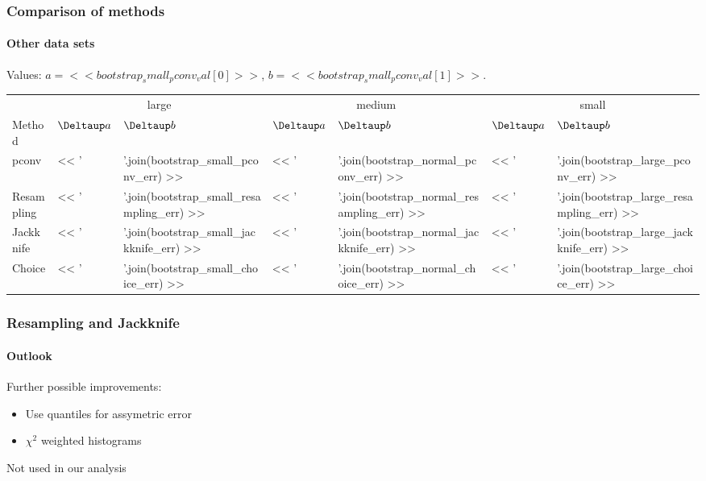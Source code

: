 \documentclass[english, fleqn]{beamer}
\begin{document}
\begin{frame}
    \frametitle{Comparison of methods}
    \framesubtitle{Other data sets}

    Values: $a = << bootstrap_small_pconv_val[0] >>$, $b = <<
    bootstrap_small_pconv_val[1] >>$.

    \begin{tabular}{l*6l}
        \toprule
        & \multicolumn{2}{c}{large}
        & \multicolumn{2}{c}{medium}
        & \multicolumn{2}{c}{small}
        \\
        \cmidrule(rl){2-3}
        \cmidrule(rl){4-5}
        \cmidrule(l){6-7}
        Method
        & $\Deltaup a$
        & $\Deltaup b$
        & $\Deltaup a$
        & $\Deltaup b$
        & $\Deltaup a$
        & $\Deltaup b$ \\
        \midrule
        pconv
        & << ' & '.join(bootstrap_small_pconv_err) >>
        & << ' & '.join(bootstrap_normal_pconv_err) >>
        & << ' & '.join(bootstrap_large_pconv_err) >> \\
        Resampling
        & << ' & '.join(bootstrap_small_resampling_err) >>
        & << ' & '.join(bootstrap_normal_resampling_err) >>
        & << ' & '.join(bootstrap_large_resampling_err) >> \\
        Jackknife
        & << ' & '.join(bootstrap_small_jackknife_err) >>
        & << ' & '.join(bootstrap_normal_jackknife_err) >>
        & << ' & '.join(bootstrap_large_jackknife_err) >> \\
        Choice
        & << ' & '.join(bootstrap_small_choice_err) >>
        & << ' & '.join(bootstrap_normal_choice_err) >>
        & << ' & '.join(bootstrap_large_choice_err) >> \\
        \bottomrule
    \end{tabular}
\end{frame}

\begin{frame}
    \frametitle{Resampling and Jackknife}
    \framesubtitle{Outlook}

    Further possible improvements:

    \begin{itemize}
        \item Use quantiles for assymetric error
        \item $\chi^2$ weighted histograms
    \end{itemize}

    \pause

    Not used in our analysis
\end{frame}
\end{document}
